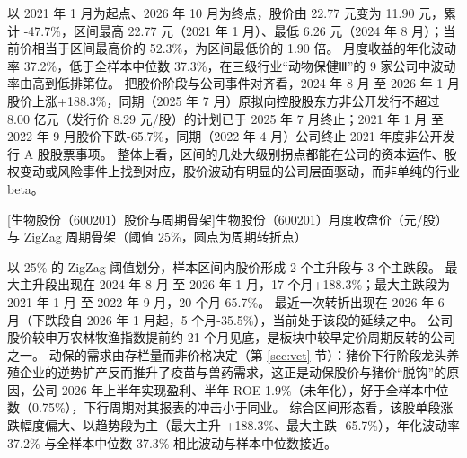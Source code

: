  以 2021 年 1 月为起点、2026 年 10 月为终点，股价由 22.77 元变为 11.90 元，累计 -47.7\%，区间最高 22.77 元（2021 年 1 月）、最低 6.26 元（2024 年 8 月）；当前价相当于区间最高价的 52.3\%，为区间最低价的 1.90 倍。 月度收益的年化波动率 37.2\%，低于全样本中位数 37.3\%，在三级行业“动物保健Ⅲ”的 9 家公司中波动率由高到低排第位。 把股价阶段与公司事件对齐看，2024 年 8 月 至 2026 年 1 月股价上涨+188.3\%，同期（2025 年 7 月）原拟向控股股东方非公开发行不超过 8.00 亿元（发行价 8.29 元/股）的计划已于 2025 年 7 月终止；2021 年 1 月 至 2022 年 9 月股价下跌-65.7\%，同期（2022 年 4 月）公司终止 2021 年度非公开发行 A 股股票事项。 整体上看，区间的几处大级别拐点都能在公司的资本运作、股权变动或风险事件上找到对应，股价波动有明显的公司层面驱动，而非单纯的行业 beta。

\begin{center}
\begin{minipage}{\textwidth}\centering
{}

[生物股份（600201）股价与周期骨架]{生物股份（600201）月度收盘价（元/股）与 ZigZag 周期骨架（阈值 25\%，圆点为周期转折点）}
\end{minipage}
\end{center}

 以 25\% 的 ZigZag 阈值划分，样本区间内股价形成 2 个主升段与 3 个主跌段。 最大主升段出现在 2024 年 8 月 至 2026 年 1 月，17 个月+188.3\%；最大主跌段为 2021 年 1 月 至 2022 年 9 月，20 个月-65.7\%。 最近一次转折出现在 2026 年 6 月（下跌段自 2026 年 1 月起，5 个月-35.5\%），当前处于该段的延续之中。 公司股价较申万农林牧渔指数提前约 21 个月见底，是板块中较早定价周期反转的公司之一。 动保的需求由存栏量而非价格决定（第 \ref{sec:vet} 节）：猪价下行阶段龙头养殖企业的逆势扩产反而推升了疫苗与兽药需求，这正是动保股价与猪价“脱钩”的原因，公司 2026 年上半年实现盈利、半年 ROE 1.9\%（未年化），好于全样本中位数（0.75\%），下行周期对其报表的冲击小于同业。 综合区间形态看，该股单段涨跌幅度偏大、以趋势段为主（最大主升 +188.3\%、最大主跌 -65.7\%），年化波动率 37.2\% 与全样本中位数 37.3\% 相比波动与样本中位数接近。

